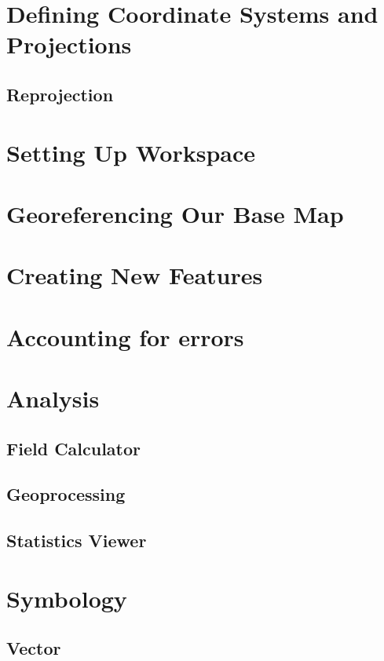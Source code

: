 \documentclass{article}
\begin{document}
\section{Defining Coordinate Systems and Projections}

\subsection{Reprojection}

\section{Setting Up Workspace}

\section{Georeferencing Our Base Map}

\section{Creating New Features}

\section{Accounting for errors}

\section{Analysis}

\subsection{Field Calculator}

\subsection{Geoprocessing}

\subsection{Statistics Viewer}

\section{Symbology}

\subsection{Vector}
\end{document}
